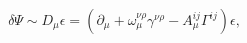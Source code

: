\begin{equation}
\delta \Psi\sim D_{\mu}\epsilon=(\partial_{\mu}+\omega_{\mu}^{\nu\rho}\gamma^{\nu\rho}
-A_{\mu}^{ij}\Gamma^{ij})\epsilon,
\label{twist0}
\end{equation}


